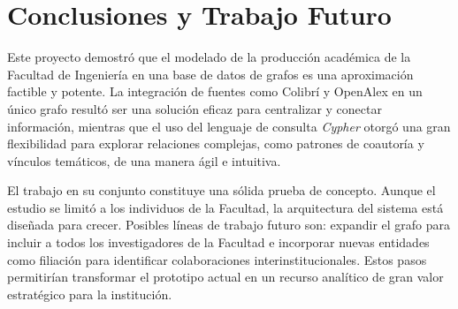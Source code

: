 \documentclass[journal]{IEEEtran}
\begin{document}
\section{Conclusiones y Trabajo Futuro}
\label{conclusion}
Este proyecto demostró que el modelado de la producción académica de la Facultad de Ingeniería en una base de datos de grafos es una aproximación factible y potente. La integración de fuentes como Colibrí y OpenAlex en un único grafo resultó ser una solución eficaz para centralizar y conectar información, mientras que el uso del lenguaje de consulta \textit{Cypher} otorgó una gran flexibilidad para explorar relaciones complejas, como patrones de coautoría y vínculos temáticos, de una manera ágil e intuitiva.

El trabajo en su conjunto constituye una sólida prueba de concepto. Aunque el estudio se limitó a los individuos de la Facultad, la arquitectura del sistema está diseñada para crecer. Posibles líneas de trabajo futuro son: expandir el grafo para incluir a todos los investigadores de la Facultad e incorporar nuevas entidades como filiación para identificar colaboraciones interinstitucionales. Estos pasos permitirían transformar el prototipo actual en un recurso analítico de gran valor estratégico para la institución.

%


\end{document}
